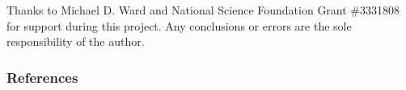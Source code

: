 \documentclass[12pt,letterpaper]{article} %
\begin{document}
Thanks to Michael D. Ward and National Science Foundation Grant \#3331808 for support during this project. Any conclusions or errors are the sole responsibility of the author.

\newpage
\subsubsection*{References}



\begingroup
\renewcommand{\section}[2]{}


\endgroup
\end{document}
